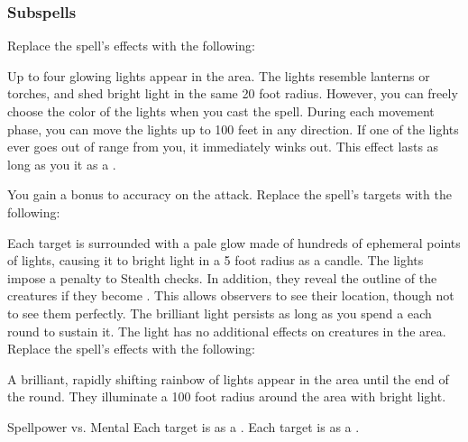 \subsubsection{Subspells}
Replace the spell's effects with the following:
\begin{spellcontent}
\begin{augmenteffects}
\spelleffect
Up to four glowing lights appear in the area.
The lights resemble lanterns or torches, and shed bright light in the same 20 foot radius.
However, you can freely choose the color of the lights when you cast the spell.
During each movement phase, you can move the lights up to 100 feet in any direction.
If one of the lights ever goes out of range from you, it immediately winks out.
This effect lasts as long as you  it as a .
\end{augmenteffects}
\end{spellcontent}
You gain a  bonus to accuracy on the attack.
Replace the spell's targets with the following:
\begin{spellcontent}
\begin{augmenttargetinginfo}
\end{augmenttargetinginfo}
\end{spellcontent}
Each target is surrounded with a pale glow made of hundreds of ephemeral points of lights, causing it to bright light in a 5 foot radius as a candle.
The lights impose a  penalty to Stealth checks.
In addition, they reveal the outline of the creatures if they become .
This allows observers to see their location, though not to see them perfectly.
The brilliant light persists as long as you spend a  each round to sustain it.
The light has no additional effects on creatures in the area.
Replace the spell's effects with the following:
\begin{spellcontent}
\begin{augmenteffects}
\spelleffect
A brilliant, rapidly shifting rainbow of lights appear in the area until the end of the round.
They illuminate a 100 foot radius around the area with bright light.
\begin{spellattack}{Spellpower vs. Mental}
\spellsuccess
Each target is \disoriented as a .
\spellcritical
Each target is \confused as a .
\end{spellattack}
\end{augmenteffects}
\end{spellcontent}
